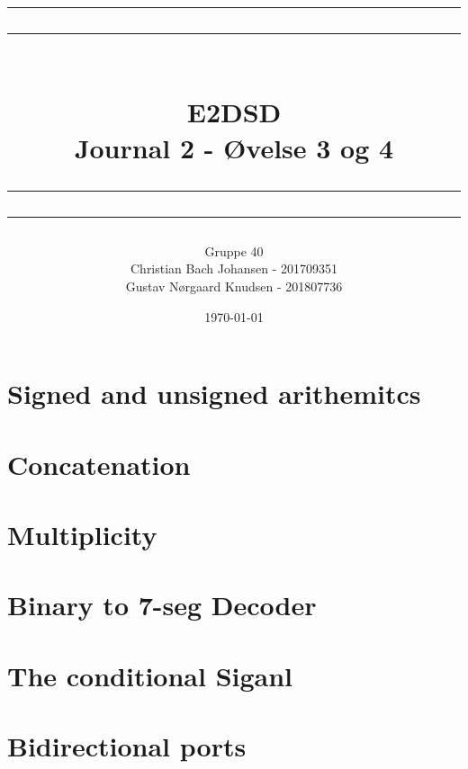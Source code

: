 \documentclass[12pt,a4paper]{article}
\newcommand\mymaketitle[1]{
   \rule{\textwidth}{1.6pt}\vspace*{-\baselineskip}\vspace*{2pt}
   \rule{\textwidth}{0.4pt}
   \\  
   \huge \bf #1\\
   \vspace{-8pt}
   \rule{\textwidth}{0.4pt}\vspace*{-\baselineskip}\vspace{3.2pt}
   \rule{\textwidth}{1.6pt}
}
\begin{document}
\title{
	\mymaketitle{E2DSD\\Journal 2 - Øvelse 3 og 4}
}
\author{
	Gruppe 40\\
	Christian Bach Johansen - 201709351\\
	Gustav Nørgaard Knudsen - 201807736
}
\date{\today}

\maketitle



\section{Signed and unsigned arithemitcs}

\newpage

\section{Concatenation}


\section{Multiplicity}


\section{Binary to 7-seg Decoder}


\section{The conditional Siganl}


\section{Bidirectional ports}

\end{document}
